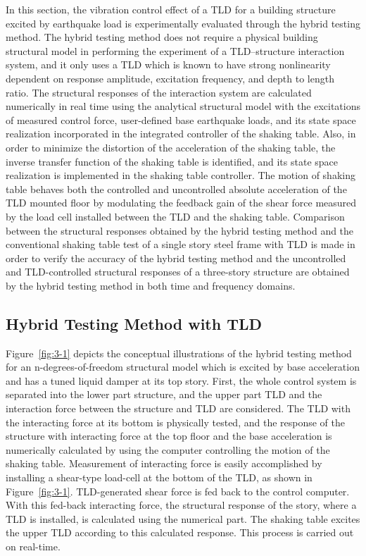 In this section, the vibration control effect of a TLD for a building structure excited by earthquake load is experimentally evaluated through the hybrid testing method. The hybrid testing method does not require a physical building structural model in performing the experiment of a TLD–structure interaction system, and it only uses a TLD which is known to have strong nonlinearity dependent on response amplitude, excitation frequency, and depth to length ratio\citep{yu1999non}. The structural responses of the interaction system are calculated numerically in real time using the analytical structural model with the excitations of measured control force, user-defined base earthquake loads, and its state space realization incorporated in the integrated controller of the shaking table. Also, in order to minimize the distortion of the acceleration of the shaking table, the inverse transfer function of the shaking table is identified, and its state space realization is implemented in the shaking table controller. The motion of shaking table behaves both the controlled and uncontrolled absolute acceleration of the TLD mounted floor by modulating the feedback gain of the shear force measured by the load cell installed between the TLD and the shaking table. Comparison between the structural responses obtained by the hybrid testing method and the conventional shaking table test of a single story steel frame with TLD is made in order to verify the accuracy of the hybrid testing method and the uncontrolled and TLD-controlled structural responses of a three-story structure are obtained by the hybrid testing method in both time and frequency domains.

\subsection{Hybrid Testing Method with TLD}
Figure~\ref{fig:3-1} depicts the conceptual illustrations of the hybrid testing method for an n-degrees-of-freedom structural model which is excited by base acceleration and has a tuned liquid damper at its top story. First, the whole control system is separated into the lower part structure, and the upper part TLD and the interaction force between the structure and TLD are considered. The TLD with the interacting force at its bottom is physically tested, and the response of the structure with interacting force at the top floor and the base acceleration is numerically calculated by using the computer controlling the motion of the shaking table. Measurement of interacting force is easily accomplished by installing a shear-type load-cell at the bottom of the TLD, as shown in Figure~\ref{fig:3-1}. TLD-generated shear force is fed back to the control computer. With this fed-back interacting force, the structural response of the story, where a TLD is installed, is calculated using the numerical part. The shaking table excites the upper TLD according to this calculated response. This process is carried out on real-time.

